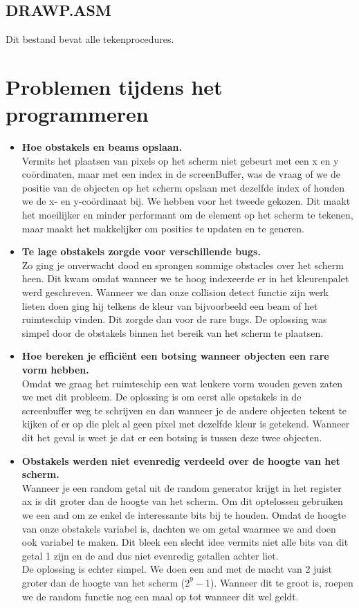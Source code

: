 \documentclass{article}
\begin{document}
\subsection{DRAWP.ASM}\label{drawp_asm}
Dit bestand bevat alle tekenprocedures. 


\section{Problemen tijdens het programmeren}\label{problems}
\begin {itemize}

\item \textbf{Hoe obstakels en beams opslaan.}\\
Vermits het plaatsen van pixels op het scherm niet gebeurt met een x en y co\"{o}rdinaten, maar met een index in de screenBuffer, was de vraag of we de positie van de objecten op het scherm opslaan met dezelfde index of houden we de x- en y-co\"{o}rdinaat bij. We hebben voor het tweede gekozen. Dit maakt het moeilijker en minder performant om de element op het scherm te tekenen, maar maakt het makkelijker om posities te updaten en te generen.

\item \textbf{Te lage obstakels zorgde voor verschillende bugs.}\\
Zo ging je onverwacht dood en sprongen sommige obstacles over het scherm heen. Dit kwam omdat wanneer we te hoog indexeerde er in het kleurenpalet werd geschreven. Wanneer we dan onze collision detect functie zijn werk lieten doen ging hij telkens de kleur van bijvoorbeeld een beam of het ruimteschip vinden. Dit zorgde dan voor de rare bugs. De oplossing was simpel door de obstakels binnen het bereik van het scherm te plaatsen.

\item \textbf{Hoe bereken je effici\"{e}nt een botsing wanneer objecten een rare vorm hebben.}\\
Omdat we graag het ruimteschip een wat leukere vorm wouden geven zaten we met dit probleem. De oplossing is om eerst alle opstakels in de screenbuffer weg te schrijven en dan wanneer je de andere objecten tekent te kijken of er op die plek al geen pixel met dezelfde kleur is getekend. Wanneer dit het geval is weet je dat er een botsing is tussen deze twee objecten.

\item \textbf{Obstakels werden niet evenredig verdeeld over de hoogte van het scherm.}\\
Wanneer je een random getal uit de random generator krijgt in het register ax is dit groter dan de hoogte van het scherm. Om dit optelossen gebruiken we een and om ze enkel de interessante bits bij te houden. Omdat de hoogte van onze obstakels variabel is, dachten we om getal waarmee we and doen ook variabel te maken. Dit bleek een slecht idee vermits niet alle bits van dit getal 1 zijn en de and dus niet evenredig getallen achter liet.\\
De oplossing is echter simpel. We doen een and met de macht van 2 juist groter dan de hoogte van het scherm (\(2^9 - 1\)). Wanneer dit te groot is, roepen we de random functie nog een maal op tot wanneer dit wel geldt. 



\end{itemize}
\end{document}
